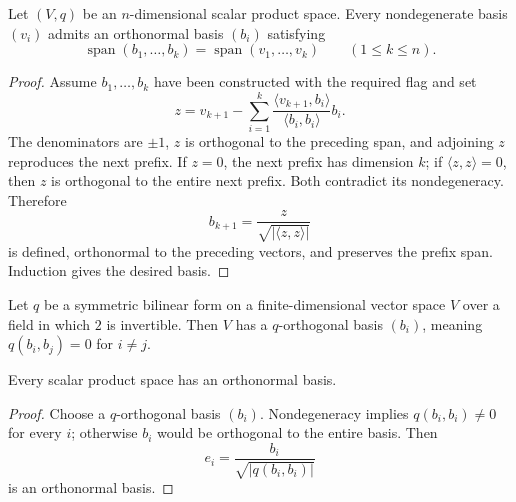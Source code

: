 \begin{proposition}
\label{prop:gram-schmidt-algorithm-scalar-products}




Let $(V,q)$ be an $n$-dimensional scalar product space. Every nondegenerate basis
$(v_i)$ admits an orthonormal basis $(b_i)$ satisfying
\[
\operatorname{span}(b_1,\ldots,b_k)
=\operatorname{span}(v_1,\ldots,v_k)
\qquad(1\leq k\leq n).
\]
\end{proposition}

\begin{proof}

\sketch Assume $b_1,\ldots,b_k$ have been constructed with the required flag and
set
\[
z=v_{k+1}-\sum_{i=1}^k
\frac{\langle v_{k+1},b_i\rangle}{\langle b_i,b_i\rangle}b_i.
\]
The denominators are $\pm1$, $z$ is orthogonal to the preceding span, and adjoining
$z$ reproduces the next prefix. If $z=0$, the next prefix has dimension $k$; if
$\langle z,z\rangle=0$, then $z$ is orthogonal to the entire next prefix. Both
contradict its nondegeneracy. Therefore
\[
b_{k+1}=\frac{z}{\sqrt{|\langle z,z\rangle|}}
\]
is defined, orthonormal to the preceding vectors, and preserves the prefix span.
Induction gives the desired basis.
\end{proof}

\begin{proposition}
\label{prop:symmetric-bilinear-orthogonal-basis}



Let $q$ be a symmetric bilinear form on a finite-dimensional vector space $V$
over a field in which $2$ is invertible. Then $V$ has a $q$-orthogonal basis
$(b_i)$, meaning $q(b_i,b_j)=0$ for $i\ne j$.
\end{proposition}

\begin{proposition}
\label{prop:scalar-product-orthonormal-basis}





Every scalar product space has an orthonormal basis.
\end{proposition}

\begin{proof}

\sketch Choose a $q$-orthogonal basis $(b_i)$. Nondegeneracy implies
$q(b_i,b_i)\ne0$ for every $i$; otherwise $b_i$ would be orthogonal to the entire
basis. Then
\[
e_i=\frac{b_i}{\sqrt{|q(b_i,b_i)|}}
\]
is an orthonormal basis.
\end{proof}

